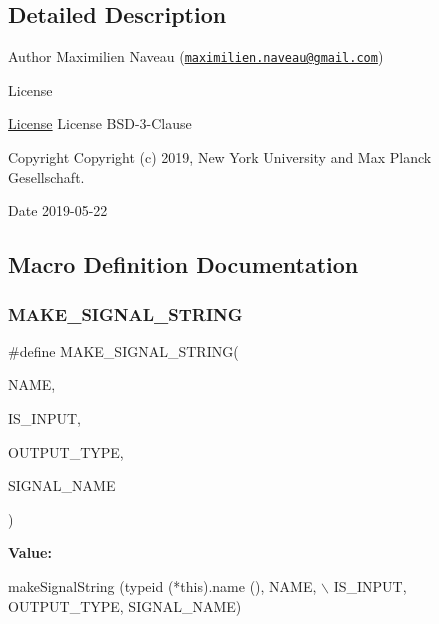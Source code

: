 \subsection{Detailed Description}
\begin{DoxyAuthor}{Author}
Maximilien Naveau (\href{mailto:maximilien.naveau@gmail.com}{\tt maximilien.\+naveau@gmail.\+com}) 
\end{DoxyAuthor}
\begin{DoxyRefDesc}{License}
\item[\hyperlink{license__license000019}{License}]License B\+S\+D-\/3-\/\+Clause \end{DoxyRefDesc}
\begin{DoxyCopyright}{Copyright}
Copyright (c) 2019, New York University and Max Planck Gesellschaft. 
\end{DoxyCopyright}
\begin{DoxyDate}{Date}
2019-\/05-\/22 
\end{DoxyDate}


\subsection{Macro Definition Documentation}
\mbox{\label{dg__to__ros_8hh_ade0f70d8d762df505413a17bdbbe5eb0}} 
\subsubsection{\texorpdfstring{M\+A\+K\+E\+\_\+\+S\+I\+G\+N\+A\+L\+\_\+\+S\+T\+R\+I\+NG}{MAKE\_SIGNAL\_STRING}}
{\footnotesize\ttfamily \#define M\+A\+K\+E\+\_\+\+S\+I\+G\+N\+A\+L\+\_\+\+S\+T\+R\+I\+NG(\begin{DoxyParamCaption}\item[{}]{N\+A\+ME,  }\item[{}]{I\+S\+\_\+\+I\+N\+P\+UT,  }\item[{}]{O\+U\+T\+P\+U\+T\+\_\+\+T\+Y\+PE,  }\item[{}]{S\+I\+G\+N\+A\+L\+\_\+\+N\+A\+ME }\end{DoxyParamCaption})}

{\bfseries Value\+:}
\begin{DoxyCode}
makeSignalString (\textcolor{keyword}{typeid} (*this).name (), NAME,         \(\backslash\)
            IS\_INPUT, OUTPUT\_TYPE, SIGNAL\_NAME)
\end{DoxyCode}
